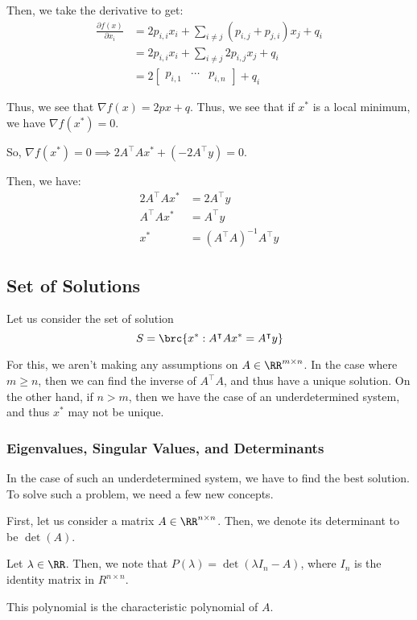 \documentclass[openany]{book}
\begin{document}
	Then, we take the derivative to get:
	\begin{align*}
		\frac{\partial f(x)}{\partial x_i} &= 2p_{i,i}x_i + \sum_{i \neq j} (p_{i,j} + p_{j,i})x_j + q_i \\
		&= 2p_{i,i}x_i + \sum_{i \neq j} 2p_{i,j}x_j + q_i \\
		&= 2 \begin{bmatrix}
			p_{i,1} & \cdots & p_{i,n}
		\end{bmatrix} + q_i
	\end{align*}

	Thus, we see that $\nabla f(x) = 2px + q$. Thus, we see that if $x^{*}$ is a local minimum, we have $\nabla f(x^{*}) = 0$.
	
	So, $\nabla f(x^{*}) = 0 \implies 2A^{\intercal}Ax^{*} + (-2A^{\intercal}y) = 0$.
	
	Then, we have:
	\begin{align*}
		2A^{\intercal}Ax^{*} &= 2A^{\intercal}y \\
		A^{\intercal}Ax^{*} &= A^{\intercal}y \\
		x^{*} &= (A^{\intercal}A)^{-1}A^{\intercal}y
	\end{align*}

\subsection{Set of Solutions}
Let us consider the set of solution
\begin{equation*}
	S = \brc{x^{*} : A^{\intercal}Ax^{*} = A^{\intercal}y}
\end{equation*}

For this, we aren't making any assumptions on $A \in \RR^{m \times n}$. In the case where $m \geq n$, then we can find the inverse of $A^{\intercal}A$, and thus have a unique solution. On the other hand, if $n > m$, then we have the case of an underdetermined system, and thus $x^{*}$ may not be unique.

\subsubsection{Eigenvalues, Singular Values, and Determinants}
In the case of such an underdetermined system, we have to find the best solution. To solve such a problem, we need a few new concepts.

First, let us consider a matrix $A \in \RR^{n \times n}$. Then, we denote its determinant to be $\det (A)$.

\begin{defn}
	Let $\lambda \in \RR$. Then, we note that $P(\lambda) = \det(\lambda I_n - A)$, where $I_n$ is the identity matrix in $R^{n \times n}$.
	
	This polynomial is the characteristic polynomial of $A$.
\end{defn}
\end{document}

